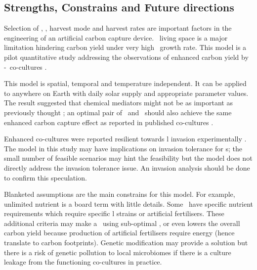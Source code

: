 \documentclass[../thesis.tex]{subfiles} %
\begin{document}
\subsection{Strengths, Constrains and Future directions}
Selection of \phy, \bac, harvest mode and harvest rates are important factors in the engineering of an artificial carbon capture device.  \Phy\ living space is a major limitation hindering carbon yield under very high \phy\ growth rate.  This model is a pilot quantitative study addressing the observations of enhanced carbon yield by \phy-\bac\ co-cultures \autocite{fuentes2016impact,santos2014microalgal}.

This model is spatial, temporal and temperature independent.  It can be applied to anywhere on Earth with daily solar supply and appropriate parameter values.  The result suggested that chemical mediators might not be as important as previously thought \autocite{fuentes2016impact}; an optimal pair of \phy\ and \bac\ should also achieve the same enhanced carbon capture effect as reported in published co-cultures \autocite{amin2009photolysis,rivas2010interactions,seyedsayamdost2011roseobacticides}.

Enhanced co-cultures were reported resilient towards \bac l invasion experimentally \autocite{fuentes2016impact,seyedsayamdost2011roseobacticides}.  The model in this study may have implications on invasion tolerance for \pbs s; the small number of feasible scenarios may hint the feasibility but the model does not directly address the invasion tolerance issue.  An invasion analysis should be done to confirm this speculation.

Blanketed assumptions are the main constrains for this model.  For example, unlimited nutrient is a board term with little details.  Some \phy\ have specific nutrient requirements \autocite{kazamia2012mutualistic} which require specific \bac l strains or artificial fertilisers.  These additional criteria may make a \pbs\ using sub-optimal \bac, or even lowers the overall carbon yield because production of artificial fertilisers require energy (hence translate to carbon footprints).  Genetic modification may provide a solution but there is a risk of genetic pollution to local microbiomes if there is a culture leakage from the functioning co-cultures in practice.
\end{document}
